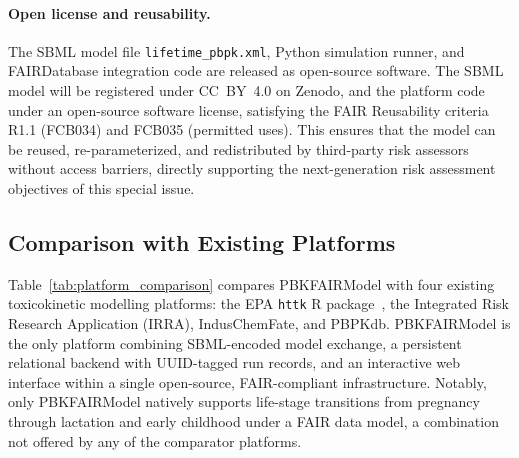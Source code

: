 \documentclass[preprint,12pt]{elsarticle}
\begin{document}
\begin{linenumbers}
\paragraph{Open license and reusability.}
The SBML model file \texttt{lifetime\_pbpk.xml}, Python simulation runner,
and FAIRDatabase integration code are released as open-source software.
The SBML model will be registered under CC~BY~4.0 on Zenodo, and the
platform code under an open-source software license, satisfying the
FAIR Reusability criteria R1.1 (FCB034) and FCB035 (permitted uses).
This ensures that the model can be reused, re-parameterized, and
redistributed by third-party risk assessors without access barriers,
directly supporting the next-generation risk assessment objectives of
this special issue.

\subsection{Comparison with Existing Platforms} %

Table~\ref{tab:platform_comparison} compares PBKFAIRModel with four
existing toxicokinetic modelling platforms: the EPA \texttt{httk} R
package~\cite{pearce2017}, the Integrated Risk Research Application
(IRRA), IndusChemFate, and PBPKdb. PBKFAIRModel is the only platform
combining SBML-encoded model exchange, a persistent relational backend
with UUID-tagged run records, and an interactive web interface within a
single open-source, FAIR-compliant infrastructure. Notably, only
PBKFAIRModel natively supports life-stage transitions from pregnancy through
lactation and early childhood under a FAIR data model, a combination not
offered by any of the comparator platforms.


\end{linenumbers}
\end{document}
